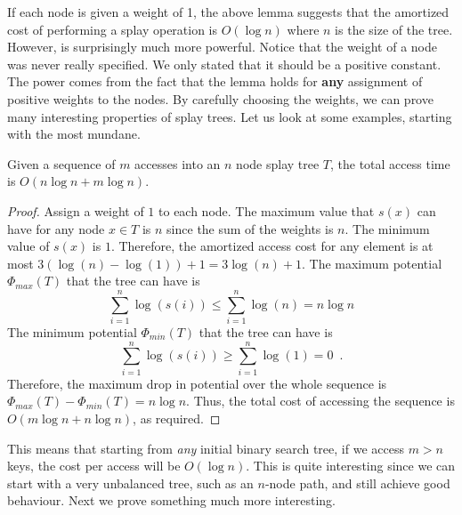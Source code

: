 {If each node is given a weight of 1, the above lemma suggests that the
amortized cost of performing a splay operation is $O(\log n)$ where
$n$ is the size of the tree. However,  is
surprisingly much more powerful. Notice that the weight of a node was
never really specified. We only stated that it should be a positive
constant. The power comes from the fact that the lemma holds for {\bf
any} assignment of positive weights to the nodes. By carefully
choosing the weights, we can prove many interesting properties of
splay trees. Let us look at some examples, starting with the most mundane.

\begin{thm}
Given a sequence of $m$ accesses into an $n$ node splay tree $T$, the
total access time is $O(n\log n + m\log n)$.
\end{thm}

\begin{proof}
Assign a weight of $1$ to each node. The maximum value that $s(x)$
can have for any node $x \in T$ is $n$ since the sum of the weights is
$n$. The minimum value of $s(x)$ is $1$. Therefore, the amortized access cost
for any element is at most $3(\log(n) - \log(1)) + 1 = 3\log(n)
+1$. The maximum potential $\Phi_{max}(T)$ that the tree can have is
\[
   \sum_{i=1}^n \log(s(i)) \leq \sum_{i=1}^n \log(n) = n\log n 
\]
The minimum
potential $\Phi_{min}(T)$ that the tree can have is 
\[
   \sum_{i=1}^n \log(s(i)) \geq \sum_{i=1}^n \log(1) = 0 \enspace .
\]
Therefore, the maximum drop in potential over the whole sequence is
$\Phi_{max}(T) - \Phi_{min}(T) = n\log n$.  Thus, the total cost of
accessing the sequence is $O(m\log n + n\log n)$, as required.
\end{proof}

This means that starting from \emph{any} initial binary search tree, if
we access $m > n$ keys, the cost per access will be $O(\log n)$. This
is quite interesting since we can start with a very unbalanced tree,
such as an $n$-node path, and still achieve good behaviour.
Next we prove something much more interesting.

%

}
